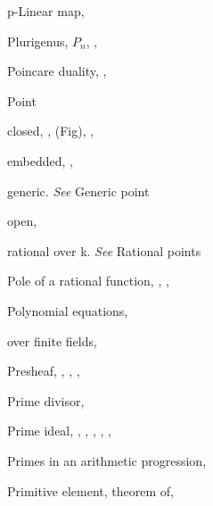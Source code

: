 {{\noindent\hspace*{0.0bp}p-Linear map, \par
\noindent\hspace*{0.0bp}Plurigenus, $P_n$, , \par
\noindent\hspace*{0.0bp}Poincare duality, , \par
\noindent\hspace*{0.0bp}Point\par
\noindent\hspace*{7.5bp}closed, ,  (Fig), , \par
\noindent\hspace*{7.5bp}embedded, , \par
\noindent\hspace*{7.5bp}generic. \emph{See} Generic point\par
\noindent\hspace*{7.5bp}open, \par
\noindent\hspace*{7.5bp}rational over k. \emph{See} Rational points\par
\noindent\hspace*{0.0bp}Pole of a rational function, , , \par
\noindent\hspace*{0.0bp}Polynomial equations, \par
\noindent\hspace*{7.5bp}over finite fields, \par
\noindent\hspace*{0.0bp}Presheaf, , , , \par
\noindent\hspace*{0.0bp}Prime divisor, \par
\noindent\hspace*{0.0bp}Prime ideal, , , , , , \par
\noindent\hspace*{0.0bp}Primes in an arithmetic progression, \par
\noindent\hspace*{0.0bp}Primitive element, theorem of, \par
}}
